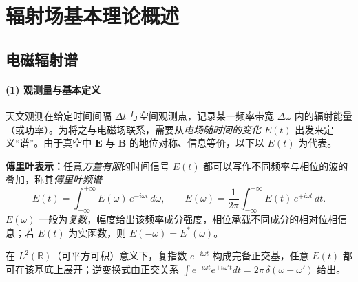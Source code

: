 \section{辐射场基本理论概述}
\subsection{电磁辐射谱}

\paragraph{(1) 观测量与基本定义}
天文观测在给定时间间隔 $\Delta t$ 与空间观测点，记录某一频率带宽 $\Delta\omega$ 内的辐射能量（或功率）。为将之与电磁场联系，需要从\emph{电场随时间的变化} $E(t)$ 出发来定义“谱”。由于真空中 $\mathbf{E}$ 与 $\mathbf{B}$ 的地位对称、信息等价，以下以 $E(t)$ 为代表。

\medskip
\noindent
\textbf{傅里叶表示：}任意\emph{方差有限}的时间信号 $E(t)$ 都可以写作不同频率与相位的波的叠加，称其\emph{傅里叶频谱}
\begin{equation}
  E(t) = \int_{-\infty}^{+\infty} E(\omega)\,e^{-i\omega t}\,d\omega ,
  \qquad
  E(\omega) = \frac{1}{2\pi}\int_{-\infty}^{+\infty} E(t)\,e^{+i\omega t}\,dt .
\end{equation}
$E(\omega)$ 一般为\emph{复数}，幅度给出该频率成分强度，相位承载不同成分的相对位相信息；若 $E(t)$ 为实函数，则 $E(-\omega)=E^*(\omega)$。

\begin{derivationnote}[为何可以用傅里叶积分展开？]
在 $L^2(\mathbb{R})$（可平方可积）意义下，复指数 $e^{-i\omega t}$ 构成完备正交基，任意 $E(t)$ 都可在该基底上展开；逆变换式由正交关系
$\int e^{-i\omega t}e^{+i\omega' t}dt=2\pi\,\delta(\omega-\omega')$ 给出。
\end{derivationnote}

